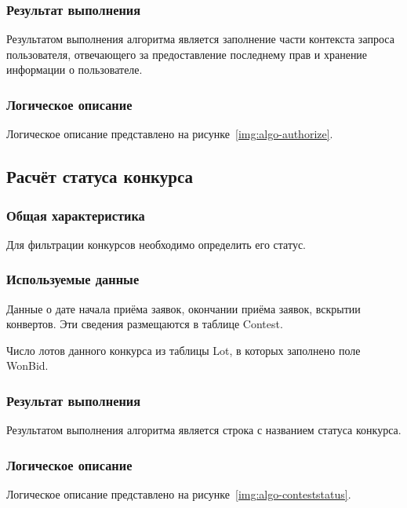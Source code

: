 \subsubsection*{Результат выполнения}

Результатом выполнения алгоритма является заполнение части контекста запроса пользователя, отвечающего за предоставление последнему прав и хранение информации о пользователе.

\subsubsection*{Логическое описание}

Логическое описание представлено на рисунке~\ref{img:algo-authorize}.
 

\clearpage

\subsection{Расчёт статуса конкурса}

\subsubsection*{Общая характеристика}

Для фильтрации конкурсов необходимо определить его статус.

\subsubsection*{Используемые данные}

Данные о дате начала приёма заявок, окончании приёма заявок, вскрытии конвертов. Эти сведения размещаются в таблице Contest.

Число лотов данного конкурса из таблицы Lot, в которых заполнено поле WonBid.

\subsubsection*{Результат выполнения}

Результатом выполнения алгоритма является строка с названием статуса конкурса.

\subsubsection*{Логическое описание}

Логическое описание представлено на рисунке~\ref{img:algo-conteststatus}.


\clearpage
\newpage
